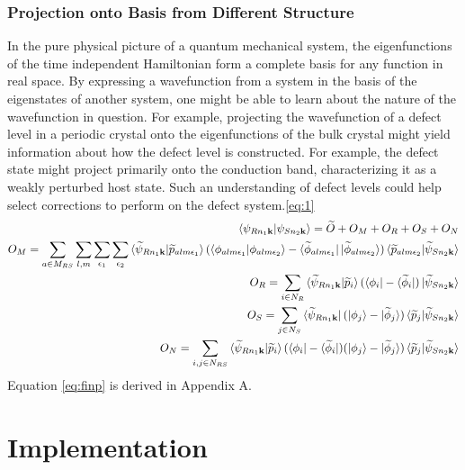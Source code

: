 \documentclass[12pt]{article}
\begin{document}
\subsubsection{Projection onto Basis from Different Structure}
In the pure physical picture of a quantum mechanical system, the eigenfunctions of the time
independent Hamiltonian form a complete basis for any function in real space. By expressing
a wavefunction from a system in the basis of the eigenstates of another system, one might
be able to learn about the nature of the wavefunction in question. For example, projecting
the wavefunction of a defect level in a periodic crystal onto the eigenfunctions of the
bulk crystal might yield information about how the defect level is constructed. For example,
the defect state might project primarily onto the conduction band, characterizing it
as a weakly perturbed host state. Such an understanding of defect levels could help select
corrections to perform on the defect system.\ref{eq:1}
\begin{equation}
\centering
\begin{split}
\braket{\psi_{Rn_1\mathbf{k}}|\psi_{Sn_2\mathbf{k}}}=\widetilde{O}+O_M+O_R+O_S+O_N\\
O_M=\sum_{a\in M_{RS}}\sum_{l,m}\sum_{\epsilon_1}\sum_{\epsilon_2}
\braket{\widetilde{\psi}_{Rn_1\mathbf{k}}|\widetilde{p}_{a\ind _1}}
(\braket{\phi_{a\ind _1}|{\phi_{a\ind _2}}}
-\bra{\widetilde{\phi}_{a\ind _1}}\ket{\widetilde{\phi}_{a\ind _2}})
\braket{\widetilde{p}_{a\ind _2}|\widetilde{\psi}_{Sn_2\mathbf{k}}}\\
O_R=\sum_{i\in N_R}\braket{\widetilde{\psi}_{Rn_1\mathbf{k}}|\widetilde{p}_i}
(\bra{\phi_i}-\bra{\widetilde{\phi}_i})
\ket{\widetilde{\psi}_{Sn_2\mathbf{k}}}\\
O_S=\sum_{j\in N_S}\bra{\widetilde{\psi}_{Rn_1\mathbf{k}}}(\ket{\phi_j}-\ket{\widetilde{\phi}_j})
\braket{\widetilde{p}_j|\widetilde{\psi}_{Sn_2\mathbf{k}}}\\
O_N=\sum_{i,j\in N_{RS}}\braket{\widetilde{\psi}_{Rn_1\mathbf{k}}|
\widetilde{p}_i}(\bra{\phi_i}-\bra{\widetilde{\phi}_i})
(\ket{\phi_j}-\ket{\widetilde{\phi}_j})\braket{\widetilde{p}_j|\widetilde{\psi}_{Sn_2\mathbf{k}}}
\end{split}
\label{eq:finp}
\end{equation}
Equation \ref{eq:finp} is derived in Appendix A.

\section{Implementation}
\end{document}
